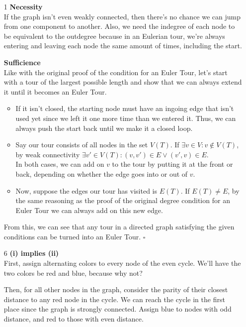 \documentclass[12pt]{article}
\begin{document}
\begin{enumerate}
      \item[1] \textbf{Necessity} \\
      If the graph isn't even weakly connected, then there's no chance
      we can jump from one component to another.
      Also, we need the indegree of each node to be equivalent to the outdegree
      because in an Eulerian tour, we're always entering and leaving each
      node the same amount of times, including the start.

      \textbf{Sufficience} \\
      Like with the original proof of the condition for an Euler Tour,
      let's start with a tour of the largest possible length and show that
      we can always extend it until it becomes an Euler Tour.
      \begin{itemize}
            \item If it isn't closed, the starting node must have an ingoing
            edge that isn't used yet since we left it one more time
            than we entered it.
            Thus, we can always push the start back until we make it a closed loop.
            \item Say our tour consists of all nodes in the set $V(T)$.
            If $\exists v \in V: v \notin V(T)$, by weak connectivity
            $\exists v' \in V(T): (v, v') \in E \lor (v', v) \in E$. \\
            In both cases, we can add on $v$ to the tour by putting it at the
            front or back, depending on whether the edge goes into or out of $v$.
            \item Now, suppose the edges our tour has visited is $E(T)$.
            If $E(T) \ne E$, by the same reasoning as the proof of the original
            degree condition for an Euler Tour we can always add on this new edge.
      \end{itemize}
      From this, we can see that any tour in a directed graph satisfying the
      given conditions can be turned into an Euler Tour. $\square$

      \item[6] \textbf{(i) implies (ii)} \\
      First, assign alternating colors to every node of the even cycle.
      We'll have the two colors be red and blue, because why not?

      Then, for all other nodes in the graph, consider the parity
      of their closest distance to any red node in the cycle.
      We can reach the cycle in the first place since the graph is strongly connected.
      Assign blue to nodes with odd distance, and red to those with even distance.


\end{enumerate}
\end{document}
